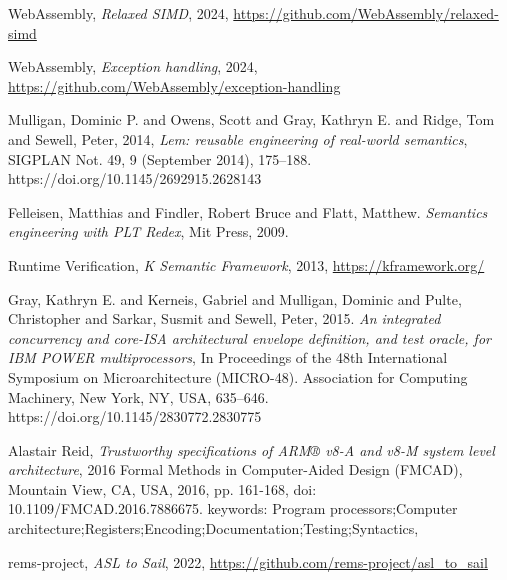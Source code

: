 \begin{thebibliography}{00}
 WebAssembly, \textit{Relaxed SIMD}, 2024, \url{https://github.com/WebAssembly/relaxed-simd}

 WebAssembly, \textit{Exception handling}, 2024, \url{https://github.com/WebAssembly/exception-handling}

 Mulligan, Dominic P. and Owens, Scott and Gray, Kathryn E. and Ridge, Tom and Sewell, Peter, 2014, \textit{Lem: reusable engineering of real-world semantics}, SIGPLAN Not. 49, 9 (September 2014), 175–188. https://doi.org/10.1145/2692915.2628143

 Felleisen, Matthias and Findler, Robert Bruce and Flatt, Matthew. \textit{Semantics engineering with PLT Redex}, Mit Press, 2009.

 Runtime Verification, \textit{K Semantic Framework}, 2013, \url{https://kframework.org/}

 Gray, Kathryn E. and Kerneis, Gabriel and Mulligan, Dominic and Pulte, Christopher and Sarkar, Susmit and Sewell, Peter, 2015. \textit{An integrated concurrency and core-ISA architectural envelope definition, and test oracle, for IBM POWER multiprocessors}, In Proceedings of the 48th International Symposium on Microarchitecture (MICRO-48). Association for Computing Machinery, New York, NY, USA, 635–646. https://doi.org/10.1145/2830772.2830775

 Alastair Reid, \textit{Trustworthy specifications of ARM® v8-A and v8-M system level architecture}, 2016 Formal Methods in Computer-Aided Design (FMCAD), Mountain View, CA, USA, 2016, pp. 161-168, doi: 10.1109/FMCAD.2016.7886675. keywords: {Program processors;Computer architecture;Registers;Encoding;Documentation;Testing;Syntactics},

 rems-project, \textit{ASL to Sail}, 2022, \url{https://github.com/rems-project/asl_to_sail}




\end{thebibliography}
